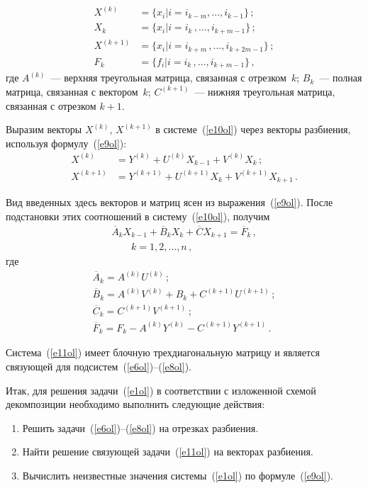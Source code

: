 \begin{multicols}{2}
\noindent
\begin{align*}
X^{(k)}& = \{x_i| i = i_{k-m},\ldots ,i_{k-1}\}\,;\\
X_k &= \{x_i| i = i_k\,,\ldots ,i_{k+m-1}\}\,;\\
X^{(k+1)} & = \{x_i| i = i_{k+m}\, ,\ldots ,i_{k+2m-1}\}\,;\\
F_k &= \{f_i| i = i_k\,, \ldots ,i_{k+m-1}\}\,,
\end{align*}
где
$A^{(k)}$~--- верхняя треугольная матрица, связанная с отрезком~$k$;
$B_k$~--- полная матрица, связанная с вектором~$k$;
$C^{(k+1)}$~--- нижняя треугольная матрица, связанная с отрезком $k + 1$.

     Выразим векторы $X^{(k)}$, $X^{(k+1)}$ в системе~(\ref{e10ol}) через
векторы разбиения, используя формулу~(\ref{e9ol}):
     \begin{align*}
     X^{(k)} & = Y^{(k)}+U^{(k)} X_{k-1} +V^{(k)} X_k\,;\\
     X^{(k+1)} & = Y^{(k+1)}+U^{(k+1)} X_{k} +V^{(k+1)} X_{k+1}\,.
     \end{align*}

     Вид введенных здесь векторов и матриц ясен из выражения~(\ref{e9ol}).
После подстановки этих соотношений в систему~(\ref{e10ol}), получим
     \begin{multline}
    \overline{A}_k X_{k-1} +\overline{B}_k X_k +\overline{C}X_{k+1} =
\overline{F}_k\,,\\
\ \ \ \ \ \ \ \ \ k=1, 2, \ldots , n\,,\label{e11ol}
\end{multline}
где
\begin{gather*}
\overline{A}_k  = A^{(k)}U^{(k)}\,;\\
\overline{B}_k  = A^{(k)}V^{(k)}+B_k+C^{(k+1)}U^{(k+1)}\,;\\
\overline{C}_k  = C^{(k+1)}V^{(k+1)}\,;\\
\overline{F}_k  = F_k - A^{(k)}Y^{(k)} - C^{(k+1)}
Y^{(k+1)}\,.
\end{gather*}

     Система~(\ref{e11ol}) имеет блочную трехдиагональную матрицу и
является связующей для под\-сис\-тем~\mbox{(\ref{e6ol})--(\ref{e8ol}).}

     Итак, для решения задачи~(\ref{e1ol}) в соответствии с изложенной
схемой декомпозиции необходимо выполнить следующие действия:
     \begin{enumerate}[1.]
\item Решить задачи~(\ref{e6ol})--(\ref{e8ol}) на отрезках разбиения.
\item Найти решение связующей задачи~(\ref{e11ol}) на векторах разбиения.
\item Вычислить неизвестные значения системы~(\ref{e1ol}) по
формуле~(\ref{e9ol}).
     \end{enumerate}


\end{multicols}
